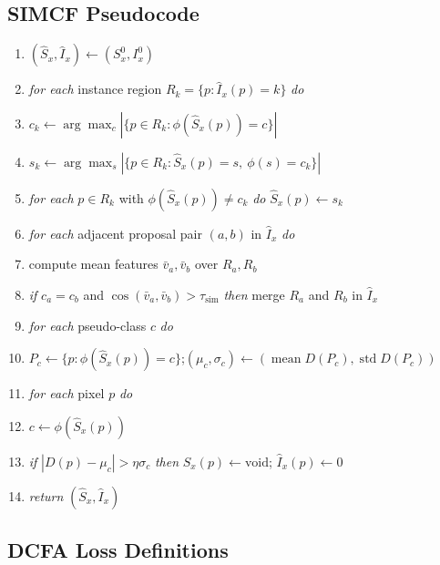 \documentclass{article}
\begin{document}
\subsection{SIMCF Pseudocode}
\label{sec:supp:impl:simcf_alg}

\begin{algorithm}[H]
\caption{SIMCF$(S_x^0,I_x^0,D,\phi,v;\tau_\text{sim},\eta)$. $\phi$ maps over-clusters to the 27-class CAUSE taxonomy; $v$ is dense DINOv3 features.}
\label{alg:simcf}
\begin{enumerate}
\setlength{\itemsep}{0pt}
\item $(\hat S_x,\hat I_x) \gets (S_x^0,I_x^0)$
\item \textit{for each} instance region $R_k=\{p:\hat I_x(p)=k\}$ \textit{do}
\item \quad $c_k \gets \arg\max_c |\{p\in R_k:\phi(\hat S_x(p))=c\}|$
\item \quad $s_k \gets \arg\max_s |\{p\in R_k:\hat S_x(p)=s,\ \phi(s)=c_k\}|$
\item \quad \textit{for each} $p\in R_k$ with $\phi(\hat S_x(p))\ne c_k$ \textit{do} $\hat S_x(p)\gets s_k$
\item \textit{for each} adjacent proposal pair $(a,b)$ in $\hat I_x$ \textit{do}
\item \quad compute mean features $\bar v_a,\bar v_b$ over $R_a,R_b$
\item \quad \textit{if} $c_a=c_b$ and $\cos(\bar v_a,\bar v_b)>\tau_\text{sim}$ \textit{then} merge $R_a$ and $R_b$ in $\hat I_x$
\item \textit{for each} pseudo-class $c$ \textit{do}
\item \quad $P_c\gets\{p:\phi(\hat S_x(p))=c\}$;\quad $(\mu_c,\sigma_c)\gets(\operatorname{mean}D(P_c),\operatorname{std}D(P_c))$
\item \textit{for each} pixel $p$ \textit{do}
\item \quad $c\gets\phi(\hat S_x(p))$
\item \quad \textit{if} $|D(p)-\mu_c|>\eta\sigma_c$ \textit{then} $\hat S_x(p)\gets\mathrm{void}$; $\hat I_x(p)\gets0$
\item \textit{return} $(\hat S_x,\hat I_x)$
\end{enumerate}
\end{algorithm}

\subsection{DCFA Loss Definitions}
\label{sec:supp:impl:dcfa_loss}
\end{document}
